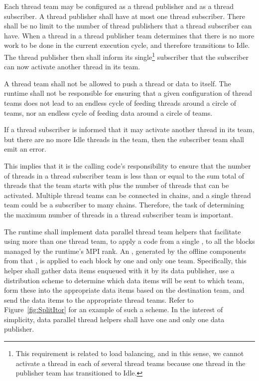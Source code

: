\documentclass{article}
\begin{document}
\begin{req}
\label{req:ThreadSubPub}
Each thread team may be configured as a thread publisher and as a
thread subscriber.  A thread publisher shall have at most one thread
subscriber. There shall be no limit to the number of thread publishers that a
thread subscriber can have.  When a thread in a thread publisher team determines
that there is no more work to be done in the current execution cycle, and
therefore transitions to Idle. The thread publisher then shall inform its
single\footnote{This requirement is related to load balancing, and in this sense,
we cannot activate a thread in each of several thread teams because one thread
in the publisher team has transitioned to Idle.} subscriber that the
subscriber can now activate another thread in its team.
\end{req}

\begin{req}
A thread team shall not be allowed to push a thread or data to itself.  The
runtime shall not be responsible for ensuring that a given configuration of
thread teams does not lead to an endless cycle of feeding threads around a
circle of teams, nor an endless cycle of feeding data around a circle of teams.
\end{req}

\begin{req}
\label{req:ThreadBalance}
If a thread subscriber is informed that it may activate another thread in its
team, but there are no more Idle threads in the team, then the subscriber team
shall emit an error.
\end{req}

This implies that it is the calling code's responsibility to ensure that the
number of threads in a thread subscriber team is less than or equal to the sum
total of threads that the team starts with plus the number of threads that can be
activated.  Multiple thread teams can be connected in chains, and a
single thread team could be a subscriber to many chains.  Therefore, the task of
determining the maximum number of threads in a thread subscriber team is important.

\begin{req}
The runtime shall implement data parallel thread team helpers that facilitate
using more than one thread team, to apply a code from a single \OLAR, to all the
blocks managed by the runtime's MPI rank. An \actionroutine, generated by
the offline components from that \OLAR, is applied to each block by one and only
one team.  Specifically, this helper shall gather data items enqueued with it by
its data publisher, use a distribution scheme to determine which data items will
be sent to which team, form these into the appropriate data items based on the
destination team, and send the data items to the appropriate thread teams.
Refer to Figure~\ref{fig:SplitItor} for an example of such a scheme.  In the
interest of simplicity, data parallel thread helpers shall have one and only one
data publisher.
\end{req}
\end{document}
